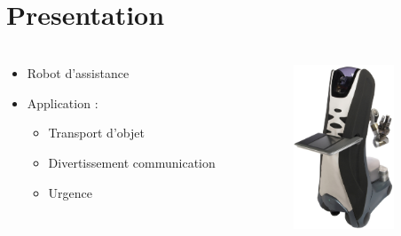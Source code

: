 \section{Presentation}
\begin{frame}
	\frametitle{}
	\begin{columns}[T]
		\begin{column}{.5\textwidth}
			\begin{itemize}
			\item Robot d'assistance
			\item Application :
				\begin{itemize}
				\item Transport d'objet
				\item Divertissement communication
				\item Urgence
				\end{itemize}
			\end{itemize}
		\end{column}
   		\begin{column}{.5\textwidth}
			\includegraphics[width=3cm]{./image/Care_o_bot_3.jpg}
   		\end{column}
	\end{columns}
\end{frame}

